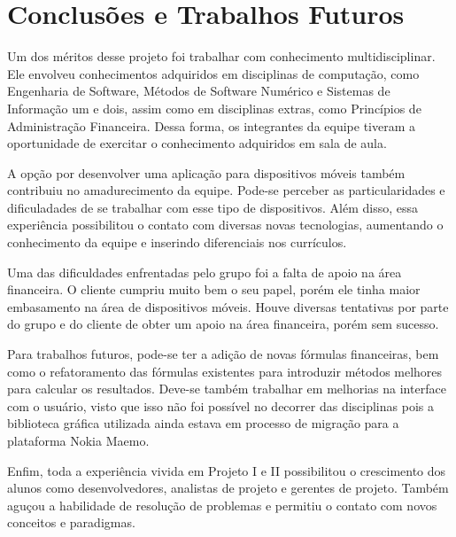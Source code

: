 \chapter{Conclusões e Trabalhos Futuros}

Um dos méritos desse projeto foi trabalhar com conhecimento multidisciplinar. Ele envolveu 
conhecimentos adquiridos em disciplinas de computação, como Engenharia de Software, Métodos de
Software Numérico e Sistemas de Informação um e dois, assim como em disciplinas extras, como
Princípios de Administração Financeira. Dessa forma, os integrantes da equipe tiveram a
oportunidade de exercitar o conhecimento adquiridos em sala de aula.

A opção por desenvolver uma aplicação para dispositivos móveis também contribuiu no amadurecimento
da equipe. Pode-se perceber as particularidades e dificuladades de se trabalhar com esse tipo
de dispositivos. Além disso, essa experiência possibilitou o contato com diversas novas tecnologias,
aumentando o conhecimento da equipe e inserindo diferenciais nos currículos.

Uma das dificuldades enfrentadas pelo grupo foi a falta de apoio na área financeira. O cliente
cumpriu muito bem o seu papel, porém ele tinha maior embasamento na área de dispositivos móveis.
Houve diversas tentativas por parte do grupo e do cliente de obter um apoio na área financeira,
porém sem sucesso.

Para trabalhos futuros, pode-se ter a adição de novas fórmulas financeiras, bem como o refatoramento
das fórmulas existentes para introduzir métodos melhores para calcular os resultados. Deve-se
também trabalhar em melhorias na interface com o usuário, visto que isso não foi possível no
decorrer das disciplinas pois a biblioteca gráfica utilizada ainda estava em processo de migração
para a plataforma Nokia Maemo.

Enfim, toda a experiência vivida em Projeto I e II possibilitou o crescimento dos alunos como
desenvolvedores, analistas de projeto e gerentes de projeto. Também aguçou a habilidade de resolução
de problemas e permitiu o contato com novos conceitos e paradigmas.